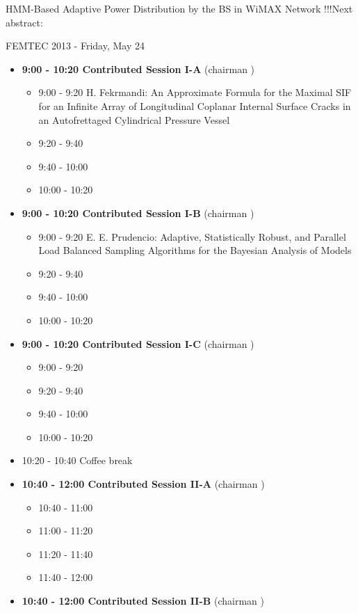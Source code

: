 \documentclass[10pt, A4]{article}%
\begin{document}
\newpage
HMM-Based Adaptive Power Distribution by the BS in WiMAX Network       !!!Next abstract: 
\centerline{\huge FEMTEC 2013 - Friday, May 24}
\vspace{4mm}
\begin{itemize}    
\item {\bf 9:00 - 10:20 Contributed Session I-A} (chairman ) 
  \begin{itemize}
    \item 9:00 - 9:20 {H. Fekrmandi}: {An Approximate Formula for the Maximal SIF for an Infinite Array of Longitudinal Coplanar Internal Surface Cracks in an Autofrettaged Cylindrical Pressure Vessel}
    \item 9:20 - 9:40 
    \item 9:40 - 10:00 
    \item 10:00 - 10:20  
  \end{itemize}
  \item {\bf 9:00 - 10:20 Contributed Session I-B} (chairman ) 
  \begin{itemize}
    \item 9:00 - 9:20 {E. E. Prudencio}: {Adaptive, Statistically Robust, and Parallel Load Balanced Sampling Algorithms for the Bayesian Analysis of Models}
    \item 9:20 - 9:40 
    \item 9:40 - 10:00 
    \item 10:00 - 10:20      
  \end{itemize}
    \item {\bf 9:00 - 10:20 Contributed Session I-C} (chairman ) 
  \begin{itemize}
    \item 9:00 - 9:20 
    \item 9:20 - 9:40 
    \item 9:40 - 10:00 
    \item 10:00 - 10:20      
  \end{itemize}
  \item 10:20 - 10:40 Coffee break
  \item {\bf 10:40 - 12:00 Contributed Session II-A} (chairman ) 
  \begin{itemize}
    \item 10:40 - 11:00 
    \item 11:00 - 11:20 
    \item 11:20 - 11:40 
    \item 11:40 - 12:00 
  \end{itemize}
  \item {\bf 10:40 - 12:00 Contributed Session II-B} (chairman ) 

\end{itemize}
\end{document}

